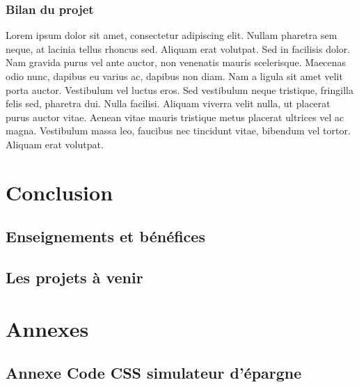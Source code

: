 \documentclass[a4paper,11pt,twoside]{report}
\begin{document}
    \subsection*{Bilan du projet}
    Lorem ipsum dolor sit amet, consectetur adipiscing elit. Nullam pharetra sem neque, at lacinia tellus rhoncus sed. Aliquam erat volutpat. Sed in facilisis dolor. Nam gravida purus vel ante auctor, non venenatis mauris scelerisque. Maecenas odio nunc, dapibus eu varius ac, dapibus non diam. Nam a ligula sit amet velit porta auctor. Vestibulum vel luctus eros. Sed vestibulum neque tristique, fringilla felis sed, pharetra dui. Nulla facilisi. Aliquam viverra velit nulla, ut placerat purus auctor vitae. Aenean vitae mauris tristique metus placerat ultrices vel ac magna. Vestibulum massa leo, faucibus nec tincidunt vitae, bibendum vel tortor. Aliquam erat volutpat.
   
    
\chapter*{Conclusion}
  \section*{Enseignements et bénéfices}
  \section*{Les projets à venir}

\chapter*{Annexes}
\thispagestyle{\chead{}}
  \section*{Annexe Code CSS simulateur d'épargne}
  \label{code_CSS_simulateur_d_epargne}
  
  
\end{document}
